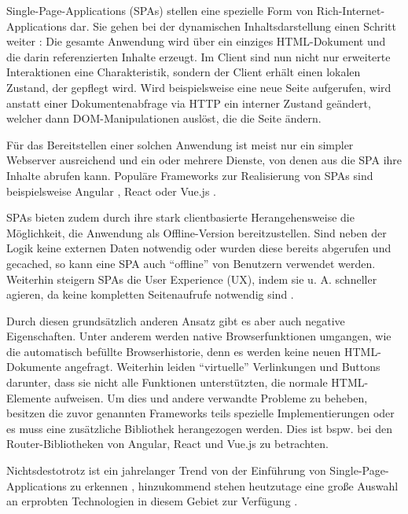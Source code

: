 Single-Page-Applications (SPAs) stellen eine spezielle Form von Rich-Internet-Applications dar. Sie gehen bei der dynamischen Inhaltsdarstellung einen Schritt weiter \cite{SinglePageApplication}: Die gesamte Anwendung wird über ein einziges HTML-Dokument und die darin referenzierten Inhalte erzeugt. Im Client sind nun nicht nur erweiterte Interaktionen eine Charakteristik, sondern der Client erhält einen lokalen Zustand, der gepflegt wird. Wird beispielsweise eine neue Seite aufgerufen, wird anstatt einer Dokumentenabfrage via HTTP ein interner Zustand geändert, welcher dann DOM-Manipulationen auslöst, die die Seite ändern.

Für das Bereitstellen einer solchen Anwendung ist meist nur ein simpler Webserver ausreichend und ein oder mehrere Dienste, von denen aus die SPA ihre Inhalte abrufen kann. Populäre Frameworks zur Realisierung von SPAs sind beispielsweise Angular \cite{AngularHomepage}, React \cite{ReactHomepage} oder Vue.js \cite{VueJSHomepage}.

SPAs bieten zudem durch ihre stark clientbasierte Herangehensweise die Möglichkeit, die Anwendung als Offline-Version bereitzustellen. Sind neben der Logik keine externen Daten notwendig oder wurden diese bereits abgerufen und gecached, so kann eine SPA auch \enquote{offline} von Benutzern verwendet werden. Weiterhin steigern SPAs die User Experience (UX), indem sie u. A. schneller agieren, da keine kompletten Seitenaufrufe notwendig sind \cite{ImprovementOfAcedemicServiceBasedOnSPA}.

Durch diesen grundsätzlich anderen Ansatz gibt es aber auch negative Eigenschaften. Unter anderem werden native Browserfunktionen umgangen, wie die automatisch befüllte Browserhistorie, denn es werden keine neuen HTML-Dokumente angefragt. Weiterhin leiden \enquote{virtuelle} Verlinkungen und Buttons darunter, dass sie nicht alle Funktionen unterstützten, die normale HTML-Elemente aufweisen. Um dies und andere verwandte Probleme zu beheben, besitzen die zuvor genannten Frameworks teils spezielle Implementierungen oder es muss eine zusätzliche Bibliothek herangezogen werden. Dies ist bspw. bei den Router-Bibliotheken von Angular, React und Vue.js zu betrachten.

Nichtsdestotrotz ist ein jahrelanger Trend von der Einführung von Single-Page-Applications zu erkennen \cite{SinglePageApplication}, hinzukommend stehen heutzutage eine große Auswahl an erprobten Technologien in diesem Gebiet zur Verfügung \cite{TheStateOfJavaScript2020}.
